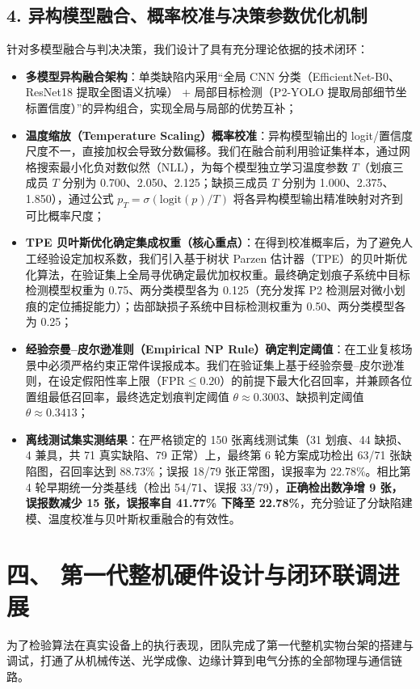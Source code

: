 \subsection*{4. 异构模型融合、概率校准与决策参数优化机制}
针对多模型融合与判决决策，我们设计了具有充分理论依据的技术闭环：
\begin{itemize}
    \item \textbf{多模型异构融合架构}：单类缺陷内采用“全局 CNN 分类（EfficientNet-B0、ResNet18 提取全图语义抗噪） + 局部目标检测（P2-YOLO 提取局部细节坐标置信度）”的异构组合，实现全局与局部的优势互补；
    \item \textbf{温度缩放（Temperature Scaling）概率校准}：异构模型输出的 logit/置信度尺度不一，直接加权会导致分数偏移。我们在融合前利用验证集样本，通过网格搜索最小化负对数似然（NLL），为每个模型独立学习温度参数 $T$（划痕三成员 $T$ 分别为 0.700、2.050、2.125；缺损三成员 $T$ 分别为 1.000、2.375、1.850），通过公式 $p_T = \sigma(\text{logit}(p)/T)$ 将各异构模型输出精准映射对齐到可比概率尺度；
    \item \textbf{TPE 贝叶斯优化确定集成权重（核心重点）}：在得到校准概率后，为了避免人工经验设定加权系数，我们引入基于树状 Parzen 估计器（TPE）的贝叶斯优化算法，在验证集上全局寻优确定最优加权权重。最终确定划痕子系统中目标检测模型权重为 0.75、两分类模型各为 0.125（充分发挥 P2 检测层对微小划痕的定位捕捉能力）；齿部缺损子系统中目标检测权重为 0.50、两分类模型各为 0.25；
    \item \textbf{经验奈曼–皮尔逊准则（Empirical NP Rule）确定判定阈值}：在工业复核场景中必须严格约束正常件误报成本。我们在验证集上基于经验奈曼–皮尔逊准则，在设定假阳性率上限（$\text{FPR} \le 0.20$）的前提下最大化召回率，并兼顾各位置组最低召回率，最终选定划痕判定阈值 $\theta \approx 0.3003$、缺损判定阈值 $\theta \approx 0.3413$；
    \item \textbf{离线测试集实测结果}：在严格锁定的 150 张离线测试集（31 划痕、44 缺损、4 兼具，共 71 真实缺陷、79 正常）上，最终第 6 轮方案成功检出 63/71 张缺陷图，召回率达到 88.73\%；误报 18/79 张正常图，误报率为 22.78\%。相比第 4 轮早期统一分类基线（检出 54/71、误报 33/79），\textbf{正确检出数净增 9 张，误报数减少 15 张，误报率自 41.77\% 下降至 22.78\%}，充分验证了分缺陷建模、温度校准与贝叶斯权重融合的有效性。
\end{itemize}

\section*{四、 第一代整机硬件设计与闭环联调进展}

为了检验算法在真实设备上的执行表现，团队完成了第一代整机实物台架的搭建与调试，打通了从机械传送、光学成像、边缘计算到电气分拣的全部物理与通信链路。

